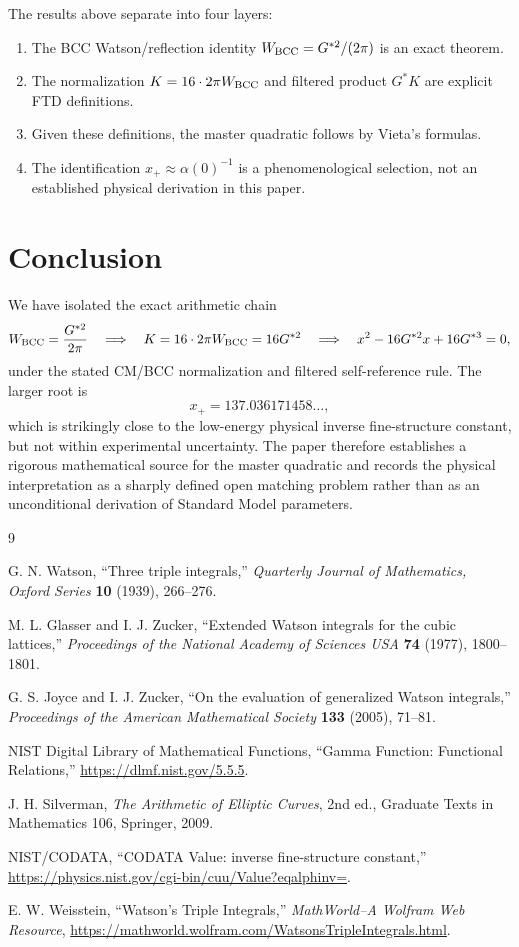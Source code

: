 \documentclass[11pt,letterpaper]{article}
\begin{document}
The results above separate into four layers:
\begin{enumerate}
    \item The BCC Watson/reflection identity
    $W_{\rm BCC}=G^{*2}/(2\pi)$ is an exact theorem.
    \item The normalization $K=16\cdot2\pi W_{\rm BCC}$ and filtered product
    $G^*K$ are explicit FTD definitions.
    \item Given these definitions, the master quadratic follows by Vieta's
    formulas.
    \item The identification $x_+\approx\alpha(0)^{-1}$ is a phenomenological
    selection, not an established physical derivation in this paper.
\end{enumerate}

\section{Conclusion}

We have isolated the exact arithmetic chain
\[
W_{\rm BCC}=\frac{G^{*2}}{2\pi}
\quad\Longrightarrow\quad
K=16\cdot2\pi W_{\rm BCC}=16G^{*2}
\quad\Longrightarrow\quad
x^2-16G^{*2}x+16G^{*3}=0,
\]
under the stated CM/BCC normalization and filtered self-reference rule. The
larger root is
\[
x_+=137.036171458\ldots,
\]
which is strikingly close to the low-energy physical inverse fine-structure
constant, but not within experimental uncertainty. The paper therefore
establishes a rigorous mathematical source for the master quadratic and records
the physical interpretation as a sharply defined open matching problem rather
than as an unconditional derivation of Standard Model parameters.

\begin{thebibliography}{9}

G. N. Watson,
``Three triple integrals,''
\emph{Quarterly Journal of Mathematics, Oxford Series} \textbf{10} (1939),
266--276.

M. L. Glasser and I. J. Zucker,
``Extended Watson integrals for the cubic lattices,''
\emph{Proceedings of the National Academy of Sciences USA} \textbf{74} (1977),
1800--1801.

G. S. Joyce and I. J. Zucker,
``On the evaluation of generalized Watson integrals,''
\emph{Proceedings of the American Mathematical Society} \textbf{133} (2005),
71--81.

NIST Digital Library of Mathematical Functions,
``Gamma Function: Functional Relations,''
\url{https://dlmf.nist.gov/5.5.5}.

J. H. Silverman,
\emph{The Arithmetic of Elliptic Curves},
2nd ed., Graduate Texts in Mathematics 106, Springer, 2009.

NIST/CODATA,
``CODATA Value: inverse fine-structure constant,''
\url{https://physics.nist.gov/cgi-bin/cuu/Value?eqalphinv=}.

E. W. Weisstein,
``Watson's Triple Integrals,''
\emph{MathWorld--A Wolfram Web Resource},
\url{https://mathworld.wolfram.com/WatsonsTripleIntegrals.html}.

\end{thebibliography}
\end{document}
